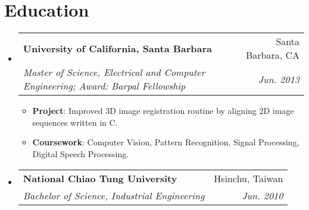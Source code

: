 \documentclass[letterpaper,12pt]{article}
\makeatletter
\newcommand{\resumeItem}[2]{
  \item\small{
    \textbf{#1}{: #2 \vspace{-2pt}}
  }
}
\newcommand{\resumeSubheading}[4]{
  \vspace{-1pt}\item
    \begin{tabular*}{0.97\textwidth}{l@{\extracolsep{\fill}}r}
      \textbf{#1} & #2 \\
      \textit{\small#3} & \textit{\small #4} \\
    \end{tabular*}\vspace{-5pt}
}
\newcommand{\resumeSubHeadingListStart}{\begin{itemize}[leftmargin=*]}
\newcommand{\resumeSubHeadingListEnd}{\end{itemize}}
\newcommand{\resumeItemListStart}{\begin{itemize}}
\newcommand{\resumeItemListEnd}{\end{itemize}\vspace{-5pt}}
\makeatother
\begin{document}
%


\section{Education}
  \resumeSubHeadingListStart
    \resumeSubheading
      {University of California, Santa Barbara}{Santa Barbara, CA}
      {Master of Science, Electrical and Computer Engineering; Award: Barpal Fellowship}{Jun. 2013}
    \resumeItemListStart
        \resumeItem{Project}
          {Improved 3D image registration routine by aligning 2D image sequences written in C.}
        \resumeItem{Coursework}
          {Computer Vision, Pattern Recognition, Signal Processing, Digital Speech Processing.}
     \resumeItemListEnd
    \resumeSubheading
      {National Chiao Tung University}{Hsinchu, Taiwan}
      {Bachelor of Science, Industrial Engineering}{Jun. 2010}
  \resumeSubHeadingListEnd

\end{document}
